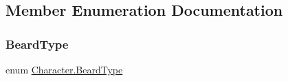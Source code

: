 \subsection{Member Enumeration Documentation}
\mbox{\label{class_character_afc1fe7f790870a92fe62d3e57296de81}} 
\subsubsection{\texorpdfstring{BeardType}{BeardType}}
{\footnotesize\ttfamily enum \mbox{\hyperlink{class_character_afc1fe7f790870a92fe62d3e57296de81}{Character.\+Beard\+Type}}\hspace{0.3cm}{\ttfamily [strong]}}

